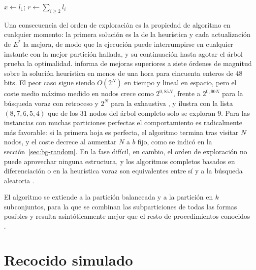 \begin{algorithm}[H]
\caption{CKK$(L)$}\label{alg:ckk}
$x \leftarrow l_1$; \quad $r \leftarrow \sum_{i \geq 2} l_i$\;
\end{algorithm}

Una consecuencia del orden de exploración es la propiedad de algoritmo en cualquier momento: la primera solución es la de la heurística y cada actualización de $E^\ast$ la mejora, de modo que la ejecución puede interrumpirse en cualquier instante con la mejor partición hallada, y su continuación hasta agotar el árbol prueba la optimalidad. \textcite{korf1998} informa de mejoras superiores a siete órdenes de magnitud sobre la solución heurística en menos de una hora para cincuenta enteros de $48$ bits. El peor caso sigue siendo $O(2^N)$ en tiempo y lineal en espacio, pero el coste medio máximo medido en nodos crece como $2^{0{,}85N}$, frente a $2^{0{,}90N}$ para la búsqueda voraz con retroceso y $2^N$ para la exhaustiva \parencite{gent1996,gent1998}, y \textcite{mertens2001} ilustra con la lista $(8,7,6,5,4)$ que de los $31$ nodos del árbol completo solo se exploran $9$. Para las instancias con muchas particiones perfectas el comportamiento es radicalmente más favorable: si la primera hoja es perfecta, el algoritmo termina tras visitar $N$ nodos, y el coste decrece al aumentar $N$ a $b$ fijo, como se indicó en la sección~\ref{sec:bg-random}. En la fase difícil, en cambio, el orden de exploración no puede aprovechar ninguna estructura, y los algoritmos completos basados en diferenciación o en la heurística voraz son equivalentes entre sí y a la búsqueda aleatoria \parencite{mertens2006}.

El algoritmo se extiende a la partición balanceada \parencite{mertens1999} y a la partición en $k$ subconjuntos, para la que se combinan las subparticiones de todas las formas posibles y resulta asintóticamente mejor que el resto de procedimientos conocidos \parencite{korf1998}.

\section{Recocido simulado}\label{sec:bg-sa}

